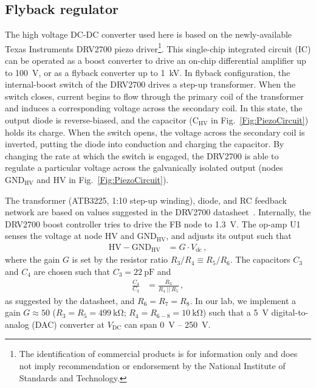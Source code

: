 \documentclass[aip,rsi,reprint]{revtex4-1} %
\begin{document}
\subsection{Flyback regulator}
\label{Sec:DRV2700}

The high voltage DC-DC converter used here is based on the newly-available Texas Instruments DRV2700 piezo driver\footnote{The identification of commercial products is for information only and does not imply recommendation or endorsement by the National Institute of Standards and Technology.}.
This single-chip integrated circuit (IC) can be operated as a boost converter to drive an on-chip differential amplifier up to \SI{100}{\volt}, or as a flyback converter up to \SI{1}{\kilo\volt}.
In flyback configuration, the internal-boost switch of the DRV2700 drives a step-up transformer.
When the switch closes, current begins to flow through the primary coil of the transformer and induces a corresponding voltage across the secondary coil.
In this state, the output diode is reverse-biased, and the capacitor ($\text{C}_{\text{HV}}$ in Fig.~\ref{Fig:PiezoCircuit}) holds its charge.
When the switch opens, the voltage across the secondary coil is inverted, putting the diode into conduction and charging the capacitor.
By changing the rate at which the switch is engaged, the DRV2700 is able to regulate a particular voltage across the galvanically isolated output (nodes $\text{GND}_\text{HV}$ and HV in Fig.~\ref{Fig:PiezoCircuit}).

The transformer (ATB3225, 1:10 step-up winding), diode, and RC feedback network are based on values suggested in the DRV2700 datasheet~\cite{DRV2700Datasheet,DRV2700EVMUserGuide}.
Internally, the DRV2700 boost controller tries to drive the FB node to \SI{1.3}{\volt}.
The op-amp U1 senses the voltage at node HV and $\text{GND}_\text{HV}$, and adjusts its output such that
\begin{align}
\label{Eq:U1Output}
\text{HV} - \text{GND}_{\text{HV}} &= G\cdot V_{\text{dc}}\,,
\end{align}
where the gain $G$ is set by the resistor ratio $R_3/R_4 \equiv R_5/R_6$.
The capacitors $C_3$ and $C_4$ are chosen such that $C_3 = \SI{22}{\pico\farad}$ and
\begin{align}
\frac{C_4}{C_3} &= \frac{R_3}{R_4~||~R_5}\,,
\end{align}
as suggested by the datasheet, and $R_6 = R_7 = R_8$.
In our lab, we implement a gain $G\approx 50$ ($R_3 = R_5 = \SI{499}{\kilo\ohm}$; $R_4 = R_{6-8} = \SI{10}{\kilo\ohm}$) such that a \SI{5}{\volt} digital-to-analog (DAC) converter at $V_\text{DC}$ can span \SI{0}{\volt} -- \SI{250}{\volt}.
\end{document}
